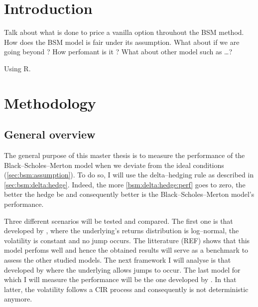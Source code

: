 \documentclass[12pt]{report}
\newcommand{\BSM}{Black--Scholes--Merton }
\begin{document}

\tableofcontents{}



%
%
\chapter*{Introduction}
\label{cha:Introduction}

Talk about what is done to price a vanilla option throuhout the BSM method.
How does the BSM model is fair under its assumption. What about if we are going beyond ?
How perfomant is it ? 
What about other model such as \ldots ?

Using R. \cite{R}
%
%
\chapter{Methodology}
\label{cha:Methodology}


\section{General overview}
\label{sec:methodology:general}

The general purpose of this master thesis is to measure the performance of the \BSM model when we deviate from the ideal conditions (\cref{sec:bsm:assumption}).
To do so, I will use the delta--hedging rule as described in \cref{sec:bsm:delta:hedge}. Indeed, the more \cref{bsm:delta:hedge:perf} goes to zero, the better the hedge be and consequently better is the \BSM model's performance.

Three different scenarios will be tested and compared. The first one is that developed by \citet{bs}, where the underlying's returns distribution is log--normal, the volatility is constant and no jump occurs. The litterature (REF) shows that this model perfoms well and hence the obtained results will serve as a benchmark to assess the other studied models.
The next framework I will analyse is that developed by \citet{merton76} where the underlying allows jumps to occur.
The last model for which I will measure the performance will be the one developed by \citet{heston1993}. In that latter, the volatility follows a CIR process and consequently is not deterministic anymore.
\end{document}
